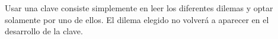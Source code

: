 Usar una clave consiste simplemente en leer los diferentes dilemas y optar solamente por uno de ellos. El dilema elegido no volverá a aparecer en el desarrollo de la clave.
\cite{claveDicotomica}


































































